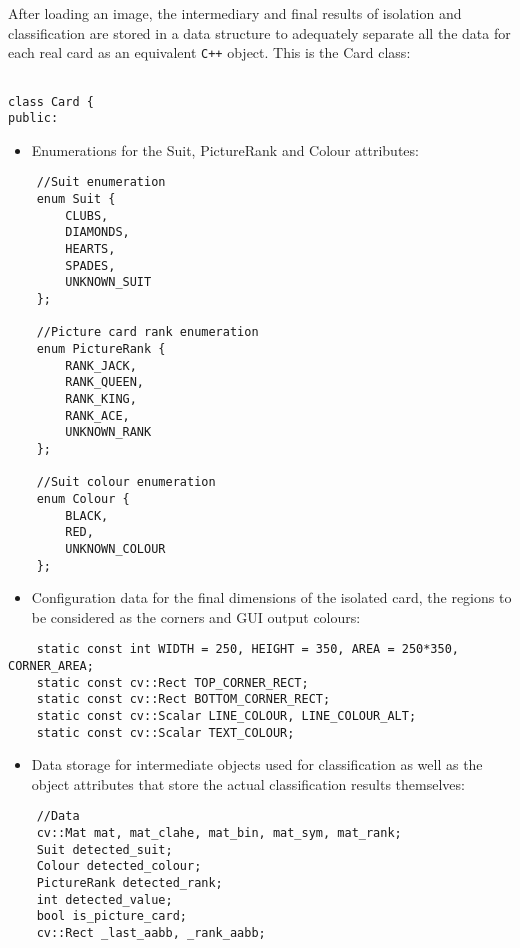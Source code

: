 After loading an image, the intermediary and final results of isolation and classification are stored in a data structure to adequately separate all the data for each real card as an equivalent \verb!C++! object. This is the Card class:

\begin{lstlisting}

class Card {
public:
\end{lstlisting}

\begin{itemize}
    \item Enumerations for the Suit, PictureRank and Colour attributes:
\end{itemize}

\begin{lstlisting}
	//Suit enumeration
	enum Suit {
	    CLUBS,
	    DIAMONDS,
	    HEARTS,
	    SPADES,
	    UNKNOWN_SUIT
	};

	//Picture card rank enumeration
	enum PictureRank {
	    RANK_JACK,
	    RANK_QUEEN,
	    RANK_KING,
	    RANK_ACE,
	    UNKNOWN_RANK
	};

	//Suit colour enumeration
	enum Colour {
	    BLACK,
	    RED,
	    UNKNOWN_COLOUR
	};
\end{lstlisting}

\begin{itemize}
    \item Configuration data for the final dimensions of the isolated card, the regions to be considered as the corners and GUI output colours:
\end{itemize}

\begin{lstlisting}
	static const int WIDTH = 250, HEIGHT = 350, AREA = 250*350, CORNER_AREA;
	static const cv::Rect TOP_CORNER_RECT;
	static const cv::Rect BOTTOM_CORNER_RECT;
	static const cv::Scalar LINE_COLOUR, LINE_COLOUR_ALT;
	static const cv::Scalar TEXT_COLOUR;
\end{lstlisting}

\begin{itemize}
	\item Data storage for intermediate  objects used for classification as well as the object attributes that store the actual classification results themselves:
\end{itemize}

\begin{lstlisting}
	//Data
	cv::Mat mat, mat_clahe, mat_bin, mat_sym, mat_rank;
	Suit detected_suit;
	Colour detected_colour;
	PictureRank detected_rank;
	int detected_value;
	bool is_picture_card;
	cv::Rect _last_aabb, _rank_aabb;
\end{lstlisting}

